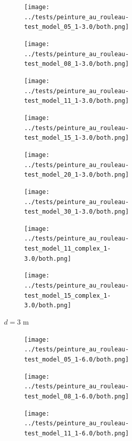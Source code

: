 \begin{theappendices}
\begin{figure}[H]
\begin{subfigure}[t]{\linewidth}
\begin{subfigure}[t]{0.11\linewidth}
					\texttt{[image: ../tests/peinture\_au\_rouleau-test\_model\_05\_1-3.0/both.png]}
				\end{subfigure}
				\hfill
				\begin{subfigure}[t]{0.11\linewidth}
					\texttt{[image: ../tests/peinture\_au\_rouleau-test\_model\_08\_1-3.0/both.png]}
				\end{subfigure}
				\hfill
				\begin{subfigure}[t]{0.11\linewidth}
					\texttt{[image: ../tests/peinture\_au\_rouleau-test\_model\_11\_1-3.0/both.png]}
				\end{subfigure}
				\hfill
				\begin{subfigure}[t]{0.11\linewidth}
					\texttt{[image: ../tests/peinture\_au\_rouleau-test\_model\_15\_1-3.0/both.png]}
				\end{subfigure}
				\hfill
				\begin{subfigure}[t]{0.11\linewidth}
					\texttt{[image: ../tests/peinture\_au\_rouleau-test\_model\_20\_1-3.0/both.png]}
				\end{subfigure}
				\hfill
				\begin{subfigure}[t]{0.11\linewidth}
					\texttt{[image: ../tests/peinture\_au\_rouleau-test\_model\_30\_1-3.0/both.png]}
				\end{subfigure}
				\hfill
				\begin{subfigure}[t]{0.11\linewidth}
					\texttt{[image: ../tests/peinture\_au\_rouleau-test\_model\_11\_complex\_1-3.0/both.png]}
				\end{subfigure}
				\hfill
				\begin{subfigure}[t]{0.11\linewidth}
					\texttt{[image: ../tests/peinture\_au\_rouleau-test\_model\_15\_complex\_1-3.0/both.png]}
				\end{subfigure}
				\caption{$d = 3$ m}
			\end{subfigure}
			\hfill
			\begin{subfigure}[t]{\linewidth}
				\centering
				\begin{subfigure}[t]{0.11\linewidth}
					\texttt{[image: ../tests/peinture\_au\_rouleau-test\_model\_05\_1-6.0/both.png]}
				\end{subfigure}
				\hfill
				\begin{subfigure}[t]{0.11\linewidth}
					\texttt{[image: ../tests/peinture\_au\_rouleau-test\_model\_08\_1-6.0/both.png]}
				\end{subfigure}
				\hfill
				\begin{subfigure}[t]{0.11\linewidth}
					\texttt{[image: ../tests/peinture\_au\_rouleau-test\_model\_11\_1-6.0/both.png]}

\end{subfigure}
\end{subfigure}
\end{figure}
\end{theappendices}
